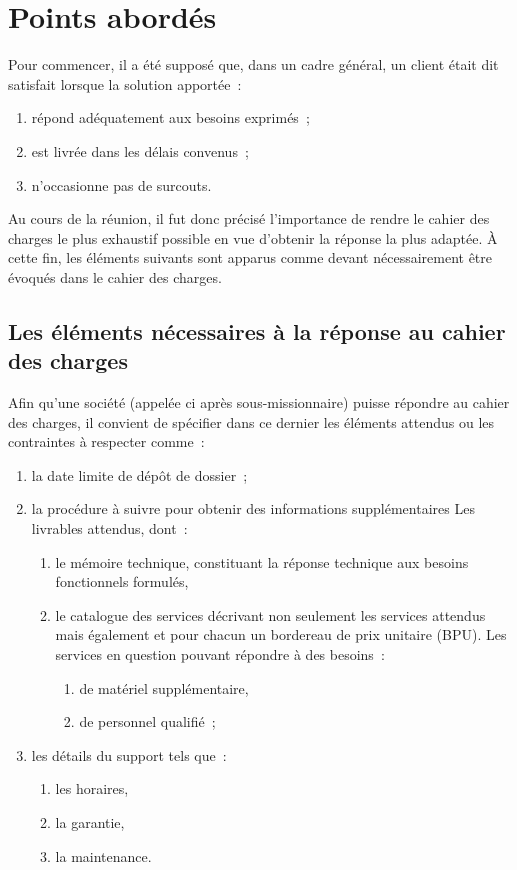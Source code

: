 \documentclass[11pt,fleqn]{report}
\begin{document}
\section{Points abordés}
Pour commencer, il a été supposé que, dans un cadre général, un client était dit \og satisfait \fg{} lorsque la solution apportée~:
\begin{enumerate}
	\item répond adéquatement aux besoins exprimés~;
	\item est livrée dans les délais convenus~;
	\item n'occasionne pas de surcouts.
\end{enumerate}
Au cours de la réunion, il fut donc précisé l'importance de rendre le cahier des charges le plus exhaustif possible en vue d'obtenir la réponse la plus adaptée. À cette fin, les éléments suivants sont apparus comme devant nécessairement être évoqués dans le cahier des charges.

\subsection{Les éléments nécessaires à la réponse au cahier des charges}
Afin qu'une société (appelée ci après sous-missionnaire) puisse répondre au cahier des charges, il convient de spécifier dans ce dernier les éléments attendus ou les contraintes à respecter comme~:
\begin{enumerate}
	\item la date limite de dépôt de dossier~;
	\item la procédure à suivre pour obtenir des informations supplémentaires
Les livrables attendus, dont~:
	\begin{enumerate}
		\item le mémoire technique, constituant la réponse technique aux besoins fonctionnels formulés,
		\item le catalogue des services décrivant non seulement les services attendus mais également et pour chacun un bordereau de prix unitaire (BPU). Les services en question pouvant répondre à des besoins~:
		\begin{enumerate}
			\item de matériel supplémentaire,
			\item de personnel qualifié~;
		\end{enumerate}
	\end{enumerate}
	\item les détails du support tels que~:
	\begin{enumerate}
		\item les horaires,
		\item la garantie,
		\item la maintenance.
	\end{enumerate}
\end{enumerate}
\end{document}
